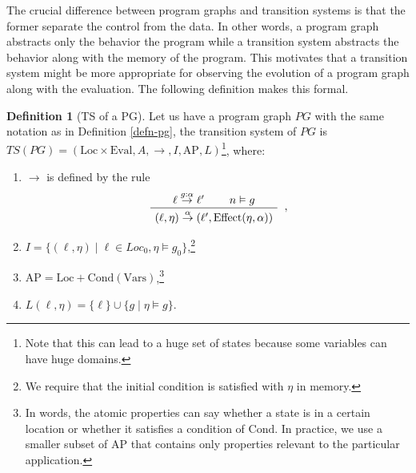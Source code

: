 \documentclass{tufte-handout} %
\theoremstyle{definition}
\newtheorem{defn}[thm]{Definition}
\theoremstyle{remark}
\newcommand{\0}{\textsf{0}}
\newcommand{\1}{\textsf{1}}
\newcommand{\AP}{\text{AP}}
\newcommand{\Loc}{\text{Loc}}
\newcommand{\Eval}{\text{Eval}}
\newcommand{\Eff}{\text{Effect}}
\newcommand{\Vars}{\text{Vars}}
\newcommand{\Cond}{\text{Cond}}
\newcommand{\action}[1]{\stackrel{#1}{\rightarrow}}
\newenvironment{bprooftree}
{\leavevmode\hbox\bgroup}
{\DisplayProof\egroup}
\begin{document}
The crucial difference between program graphs and transition systems is that the former separate the control from the data. In other words, a program graph abstracts only the behavior the program while a transition system abstracts the behavior along with the memory of the program. This motivates that a transition system might be more appropriate for observing the evolution of a program graph along with the evaluation. The following definition makes this formal.
\begin{defn}[TS of a PG]
	Let us have a program graph $PG$ with the same notation as in Definition \ref{defn-pg}, the transition system of $PG$ is $TS(PG) = (\Loc \times \Eval, A, \rightarrow, I, \AP, L)$\footnote{Note that this can lead to a huge set of states because some variables can have huge domains.}, where:
	\begin{enumerate}
		\item $\rightarrow$ is defined by the rule 
		\[	\begin{bprooftree}
				\AxiomC{$\ell \action{g: \alpha} \ell'$}
				\AxiomC{$n\vDash g$}
				\RightLabel{}
				\BinaryInfC{$(\ell, \eta) \stackrel{\alpha}{\rightarrow} (\ell', \Eff(\eta, \alpha))$}
			\end{bprooftree},\] 
		\item $I = \{(\ell, \eta)\mid \ell \in Loc_0, \eta \vDash g_0\}$,\footnote{We require that the initial condition is satisfied with $\eta$ in memory.}
		\item $\AP = \Loc + \Cond(\Vars)$,\footnote{In words, the atomic properties can say whether a state is in a certain location or whether it satisfies a condition of $\Cond$. In practice, we use a smaller subset of $\AP$ that contains only properties relevant to the particular application.}
		\item $L(\ell, \eta) = \{\ell\} \cup \{g \mid \eta \vDash g\}$.
	\end{enumerate}
\end{defn}
\end{document}
